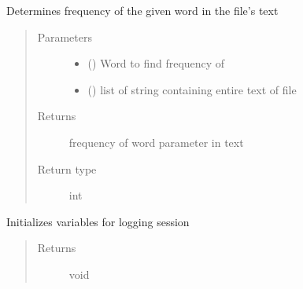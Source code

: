 \documentclass[letterpaper,10pt,english]{sphinxmanual}
\begin{document}

\begin{fulllineitems}
\label{\detokenize{functionsv1:common_functions.getwordfrequency}}
Determines frequency of the given word in the file’s text
\begin{quote}\begin{description}
\item[{Parameters}] \leavevmode\begin{itemize}
\item {} 
 () \textendash{} Word to find frequency of

\item {} 
 (\sphinxstyleliteralemphasis{{[}}\sphinxstyleliteralemphasis{{]}}) \textendash{} list of string containing entire text of file

\end{itemize}

\item[{Returns}] \leavevmode
frequency of word parameter in text

\item[{Return type}] \leavevmode
int

\end{description}\end{quote}

\end{fulllineitems}


\begin{fulllineitems}
\label{\detokenize{functionsv1:common_functions.homeCount}}
Initializes variables for logging session
\begin{quote}\begin{description}
\item[{Returns}] \leavevmode
void

\end{description}\end{quote}

\end{fulllineitems}
\end{document}

